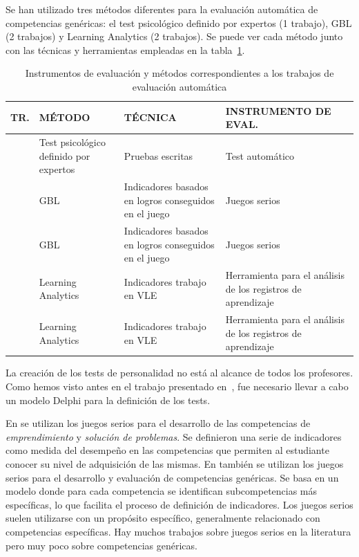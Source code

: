 Se han utilizado tres métodos diferentes para la evaluación automática de competencias genéricas: el test psicológico definido por expertos (1 trabajo), GBL (2 trabajos) y Learning Analytics (2 trabajos). Se puede ver cada método junto con las técnicas y herramientas empleadas en la tabla~\ref{tab:MetodosAutomaticos}.

\begin{table}
  \begin{center}
  \begin{tabular}{| c | m{3.5cm} | m{5cm} | m{4cm} |}
    \hline
    TR. & MÉTODO & TÉCNICA & INSTRUMENTO DE EVAL. \\
    \hline
    \hline
    \cite{andre2011formal}  & Test psicológico definido por expertos & Pruebas escritas & Test automático \\
    \hline
    \cite{guenaga2013serious}  & GBL & Indicadores basados en logros conseguidos en el juego & Juegos serios \\
    \hline
    \cite{bedek2011behavioral}  & GBL  & Indicadores basados en logros conseguidos en el juego & Juegos serios  \\
    \hline
    \cite{rayon2014web} & Learning Analytics & Indicadores trabajo en VLE & Herramienta para el análisis de los registros de aprendizaje \\
    \hline
    \cite{fidalgo:2015} & Learning Analytics & Indicadores trabajo en VLE & Herramienta para el análisis de los registros de aprendizaje \\
    \hline
  \end{tabular}
\end{center}
\caption{Instrumentos de evaluación y métodos correspondientes a los trabajos de evaluación automática}
\label{tab:MetodosAutomaticos}
\end{table} 


La creación de los  tests de personalidad no está al alcance de todos los profesores. Como hemos visto antes en el trabajo presentado en~\cite{andre2011formal}, fue necesario llevar a cabo un modelo Delphi para la definición de los tests.

En \cite{guenaga2013serious} se utilizan los juegos serios para el desarrollo de las competencias de \emph{emprendimiento} y \emph{solución de problemas}. Se definieron una serie de indicadores como medida del desempeño en las competencias que permiten al estudiante conocer su nivel de adquisición de las mismas. En \cite{bedek2011behavioral} también se utilizan los juegos serios para el desarrollo y evaluación de competencias genéricas. Se basa en un modelo donde para cada competencia se identifican subcompetencias más específicas, lo que facilita el proceso de definición de indicadores. Los juegos serios suelen utilizarse con un propósito específico, generalmente relacionado con competencias específicas. Hay muchos trabajos sobre juegos serios en la literatura pero muy poco sobre competencias genéricas. 

